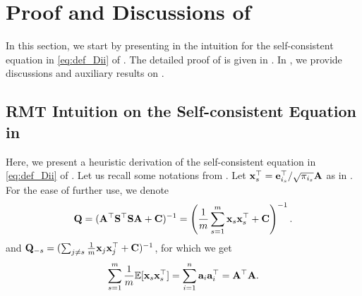 \documentclass[11pt,a4paper]{article}
\begin{document}
\section{Proof and Discussions of }
\label{sec:proof_of_theo:inverse-bias}


In this section, we start by presenting in  the intuition for the self-consistent equation in \eqref{eq:def_Dii} of .
The detailed proof of  is given in .
In , we provide discussions and auxiliary results on .


\subsection{RMT Intuition on the Self-consistent Equation in }
\label{subsec:RMT_intuition_theo:inverse-bias}



Here, we present a heuristic derivation of the self-consistent equation in \eqref{eq:def_Dii} of .
Let us recall some notations from .
Let $\mathbf{x}^\top_s=\mathbf{e}^\top_{i_s}/\sqrt{\pi_{i_s}}\mathbf{A}$ as in .
For the ease of further use, we  denote 
\begin{equation*}
  \mathbf{Q}=(\mathbf{A}^\top\mathbf{S}^\top\mathbf{S} \mathbf{A} +\mathbf{C})^{-1}= \left(\frac{1}{m} \sum^{m}_{s=1} \mathbf{x}_s{\mathbf{x}}^{\top}_s + \mathbf{C} \right)^{-1}.
\end{equation*}
 and $ \mathbf{Q}_{-s}=(\sum_{j\neq s}\frac{1}{m} \mathbf{x}_j{\mathbf{x}}^{\top}_j + \mathbf{C})^{-1}$, for which we get
\begin{equation*}
  \sum^{m}_{s=1}\frac{1}{m} {\mathbb{E}}[\mathbf{x}_s{\mathbf{x}}^{\top}_s]=\sum^n_{i=1} {\mathbf{a}}_i{\mathbf{a}}_i^\top=\mathbf{A}^\top\mathbf{A}.
\end{equation*}
\end{document}
